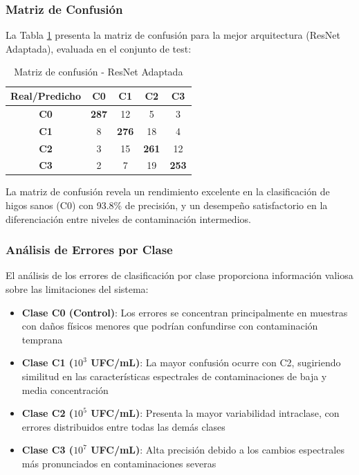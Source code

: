 \subsubsection{Matriz de Confusión}

La Tabla \ref{tab:confusion_matrix} presenta la matriz de confusión para la mejor arquitectura (ResNet Adaptada), evaluada en el conjunto de test:

\begin{table}[h!]
\centering
\caption{Matriz de confusión - ResNet Adaptada}
\begin{tabular}{|c|c|c|c|c|}
\hline
\textbf{Real/Predicho} & \textbf{C0} & \textbf{C1} & \textbf{C2} & \textbf{C3} \\
\hline
\textbf{C0} & \textbf{287} & 12 & 5 & 3 \\
\hline
\textbf{C1} & 8 & \textbf{276} & 18 & 4 \\
\hline
\textbf{C2} & 3 & 15 & \textbf{261} & 12 \\
\hline
\textbf{C3} & 2 & 7 & 19 & \textbf{253} \\
\hline
\end{tabular}
\label{tab:confusion_matrix}
\end{table}

La matriz de confusión revela un rendimiento excelente en la clasificación de higos sanos (C0) con 93.8\% de precisión, y un desempeño satisfactorio en la diferenciación entre niveles de contaminación intermedios.

\subsubsection{Análisis de Errores por Clase}

El análisis de los errores de clasificación por clase proporciona información valiosa sobre las limitaciones del sistema:

\begin{itemize}
    \item \textbf{Clase C0 (Control)}: Los errores se concentran principalmente en muestras con daños físicos menores que podrían confundirse con contaminación temprana
    \item \textbf{Clase C1 ($10^3$ UFC/mL)}: La mayor confusión ocurre con C2, sugiriendo similitud en las características espectrales de contaminaciones de baja y media concentración
    \item \textbf{Clase C2 ($10^5$ UFC/mL)}: Presenta la mayor variabilidad intraclase, con errores distribuidos entre todas las demás clases
    \item \textbf{Clase C3 ($10^7$ UFC/mL)}: Alta precisión debido a los cambios espectrales más pronunciados en contaminaciones severas
\end{itemize}

